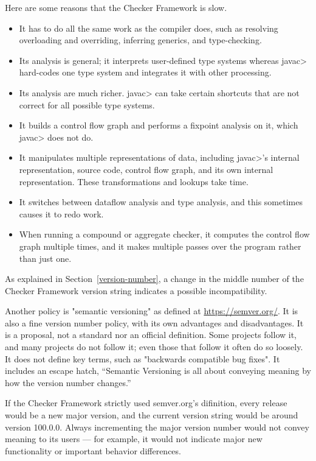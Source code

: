 Here are some reasons that the Checker Framework is slow.
\begin{itemize}
\item
  It has to do all the same work as the compiler does, such as resolving
  overloading and overriding, inferring generics, and type-checking.
\item
  Its analysis is general; it interprets user-defined type systems whereas
  \<javac> hard-codes one type system and integrates it with other processing.
\item
  Its analysis are much richer.  \<javac> can take certain shortcuts that
  are not correct for all possible type systems.
\item
  It builds a control flow graph and performs a fixpoint analysis on it,
  which \<javac> does not do.
\item
  It manipulates multiple representations of data, including \<javac>'s
  internal representation, source code, control flow graph, and its own
  internal representation.  These transformations and lookups take time.
\item
  It switches between dataflow analysis and type analysis, and this
  sometimes causes it to redo work.
\item
  When running a compound or aggregate checker, it computes the control
  flow graph multiple times, and it makes multiple passes over the program
  rather than just one.
\end{itemize}



As explained in Section~\ref{version-number}, a change in the middle number
of the Checker Framework version string indicates a possible
incompatibility.

Another policy is "semantic versioning" as defined at
\url{https://semver.org/}.  It is also a fine version number policy, with
its own advantages and disadvantages.  It is a proposal, not a standard nor
an official definition.  Some projects follow it, and many projects do not
follow it; even those that follow it often do so loosely.  It does not
define key terms, such as "backwards compatible bug fixes".  It includes an
escape hatch, ``Semantic Versioning is all about conveying meaning by how
the version number changes.''

If the Checker Framework strictly used semver.org's difinition, every
release would be a new major version, and the current version string would
be
around version 100.0.0.
Always incrementing the major version number would not convey meaning to
its users --- for example, it would not indicate major new functionality or
important behavior differences.


